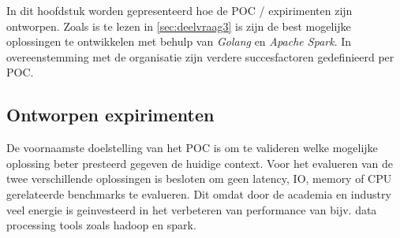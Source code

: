


In dit hoofdstuk worden gepresenteerd hoe de POC / expirimenten zijn ontworpen. Zoals is te lezen in \ref{sec:deelvraag3} is zijn de best mogelijke oplossingen te ontwikkelen met behulp van \textit{Golang} en \textit{Apache Spark}. In overeenstemming met de organisatie zijn verdere succesfactoren gedefinieerd per POC.




\subsection{Ontworpen expirimenten}

De voornaamste doelstelling van het POC is om te valideren welke mogelijke oplossing beter presteerd gegeven de huidige context.
Voor het evalueren van de twee verschillende oplossingen is besloten om geen latency, IO, memory of CPU gerelateerde benchmarks te evalueren.
Dit omdat door de  academia en industry veel energie is geinvesteerd in het verbeteren van performance van bijv. data processing tools zoals hadoop en spark.


